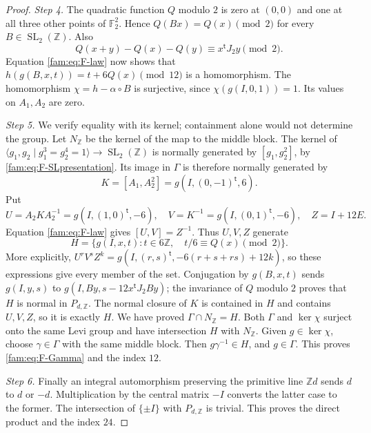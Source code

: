 \begin{proof}
\par\noindent\textit{Step 4.} The quadratic function $Q$ modulo $2$ is zero at $(0,0)$ and one at all
three other points of $\mathbb F_2^2$.  Hence $Q(Bx)=Q(x)\pmod2$ for every
$B\in\operatorname{SL}_2(\mathbb Z)$.  Also
\[
 Q(x+y)-Q(x)-Q(y)\equiv x^{\mathsf t}J_2y\pmod2.
\]
Equation \eqref{fam:eq:F-law} now shows that
$h(g(B,x,t))=t+6Q(x)\pmod{12}$ is a homomorphism.
The homomorphism $\chi=h-\alpha\circ B$ is surjective, since
$\chi(g(I,0,1))=1$.  Its values on $A_1,A_2$ are zero.

\par\noindent\textit{Step 5.} We verify equality with its kernel; containment alone would not determine
the group.  Let $N_{\mathbb Z}$ be the kernel of the map to the middle
block.  The kernel of
$\langle g_1,g_2\mid g_1^3=g_2^4=1\rangle\to
\operatorname{SL}_2(\mathbb Z)$ is normally generated by
$[g_1,g_2^2]$, by \eqref{fam:eq:F-SLpresentation}.  Its image in $\Gamma$ is
therefore normally generated by
\[
 K=[A_1,A_2^2]=g(I,(0,-1)^{\mathsf t},6).
\]
Put
\[
 U=A_2KA_2^{-1}=g(I,(1,0)^{\mathsf t},-6),\quad
 V=K^{-1}=g(I,(0,1)^{\mathsf t},-6),\quad Z=I+12E.
\]
Equation \eqref{fam:eq:F-law} gives $[U,V]=Z^{-1}$.  Thus $U,V,Z$ generate
\begin{equation}\label{fam:eq:F-H}
 H=\{g(I,x,t):t\in6\mathbb Z,\quad t/6\equiv Q(x)\pmod2\}.
\end{equation}
More explicitly,
$U^rV^sZ^k=g(I,(r,s)^{\mathsf t},-6(r+s+rs)+12k)$, so these expressions
give every member of the set.  Conjugation by $g(B,x,t)$ sends
$g(I,y,s)$ to $g(I,By,s-12x^{\mathsf t}J_2By)$; the invariance of $Q$
modulo $2$ proves that $H$ is normal in $P_{d,\mathbb Z}$.  The normal
closure of $K$ is contained in $H$ and contains $U,V,Z$, so it is exactly
$H$.  We have proved $\Gamma\cap N_{\mathbb Z}=H$.  Both $\Gamma$ and
$\ker\chi$ surject onto the same Levi group and have intersection $H$
with $N_{\mathbb Z}$.  Given $g\in\ker\chi$, choose $\gamma\in\Gamma$
with the same middle block.  Then $g\gamma^{-1}\in H$, and $g\in\Gamma$.
This proves \eqref{fam:eq:F-Gamma} and the index $12$.

\par\noindent\textit{Step 6.} Finally an integral automorphism preserving the primitive line
$\mathbb Zd$ sends $d$ to $d$ or $-d$.  Multiplication by the central
matrix $-I$ converts the latter case to the former.  The intersection of
$\{\pm I\}$ with $P_{d,\mathbb Z}$ is trivial.  This proves the direct
product and the index $24$.
\end{proof}


